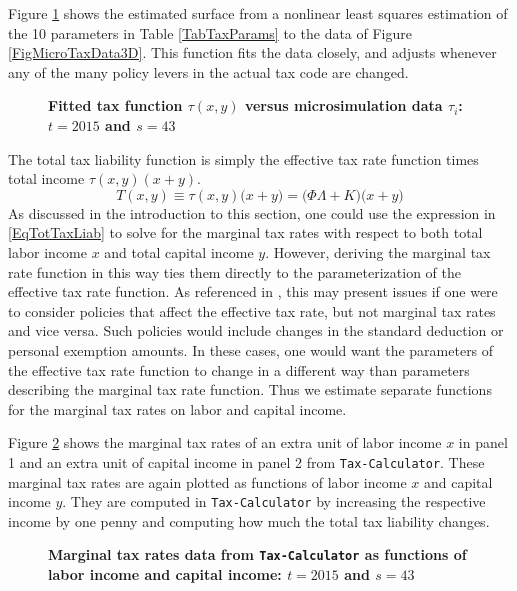\documentclass[letterpaper,12pt]{article}
\theoremstyle{definition}
\begin{document}
\begin{spacing}{1.5}
    \noindent Figure \ref{FigMicroTaxEst3D} shows the estimated surface from a nonlinear least squares estimation of the 10 parameters in Table \ref{TabTaxParams} to the data of Figure \ref{FigMicroTaxData3D}. This function fits the data closely, and adjusts whenever any of the many policy levers in the actual tax code are changed.

    \begin{figure}[htbp]\centering \captionsetup{width=5.0in}
      \caption{\label{FigMicroTaxEst3D}\textbf{Fitted tax function $\tau(x,y)$ versus microsimulation data $\tau_i$: $t=2015$ and $s=43$}}
    \end{figure}

    The total tax liability function is simply the effective tax rate function times total income $\tau(x,y)(x+y)$.
    \begin{equation}\label{EqTotTaxLiab}
      T(x,y) \equiv \tau(x,y)\bigl(x + y\bigr) = \bigl(\Phi\Lambda + K\bigr)\bigl(x + y\bigr)
    \end{equation}
    As discussed in the introduction to this section, one could use the expression in \eqref{EqTotTaxLiab} to solve for the marginal tax rates with respect to both total labor income $x$ and total capital income $y$. However, deriving the marginal tax rate function in this way ties them directly to the parameterization of the effective tax rate function. As referenced in \citet[p. 3]{BrillViard:2011}, this may present issues if one were to consider policies that affect the effective tax rate, but not marginal tax rates and vice versa. Such policies would include changes in the standard deduction or personal exemption amounts. In these cases, one would want the parameters of the effective tax rate function to change in a different way than parameters describing the marginal tax rate function. Thus we estimate separate functions for the marginal tax rates on labor and capital income.

    Figure \ref{FigMTRxyData} shows the marginal tax rates of an extra unit of labor income $x$ in panel 1 and an extra unit of capital income in panel 2 from \texttt{Tax-Calculator}. These marginal tax rates are again plotted as functions of labor income $x$ and capital income $y$. They are computed in \texttt{Tax-Calculator} by increasing the respective income by one penny and computing how much the total tax liability changes.

    \begin{figure}[htbp]\centering \captionsetup{width=6.0in}
      \caption{\label{FigMTRxyData}\textbf{Marginal tax rates data from \texttt{Tax-Calculator} as functions of labor income and capital income: $t=2015$ and $s=43$}}
    \end{figure}


\end{spacing}
\end{document}
